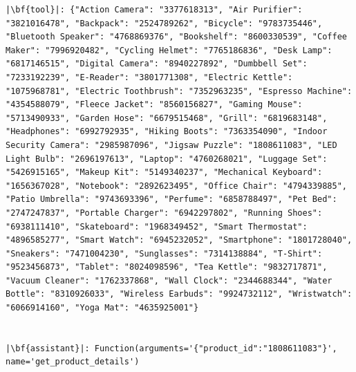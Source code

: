 \begin{verbatim}
|\bf{tool}|: {"Action Camera": "3377618313", "Air Purifier": "3821016478", "Backpack": "2524789262", "Bicycle": "9783735446", "Bluetooth Speaker": "4768869376", "Bookshelf": "8600330539", "Coffee Maker": "7996920482", "Cycling Helmet": "7765186836", "Desk Lamp": "6817146515", "Digital Camera": "8940227892", "Dumbbell Set": "7233192239", "E-Reader": "3801771308", "Electric Kettle": "1075968781", "Electric Toothbrush": "7352963235", "Espresso Machine": "4354588079", "Fleece Jacket": "8560156827", "Gaming Mouse": "5713490933", "Garden Hose": "6679515468", "Grill": "6819683148", "Headphones": "6992792935", "Hiking Boots": "7363354090", "Indoor Security Camera": "2985987096", "Jigsaw Puzzle": "1808611083", "LED Light Bulb": "2696197613", "Laptop": "4760268021", "Luggage Set": "5426915165", "Makeup Kit": "5149340237", "Mechanical Keyboard": "1656367028", "Notebook": "2892623495", "Office Chair": "4794339885", "Patio Umbrella": "9743693396", "Perfume": "6858788497", "Pet Bed": "2747247837", "Portable Charger": "6942297802", "Running Shoes": "6938111410", "Skateboard": "1968349452", "Smart Thermostat": "4896585277", "Smart Watch": "6945232052", "Smartphone": "1801728040", "Sneakers": "7471004230", "Sunglasses": "7314138884", "T-Shirt": "9523456873", "Tablet": "8024098596", "Tea Kettle": "9832717871", "Vacuum Cleaner": "1762337868", "Wall Clock": "2344688344", "Water Bottle": "8310926033", "Wireless Earbuds": "9924732112", "Wristwatch": "6066914160", "Yoga Mat": "4635925001"}


|\bf{assistant}|: Function(arguments='{"product_id":"1808611083"}', name='get_product_details')



\end{verbatim}
